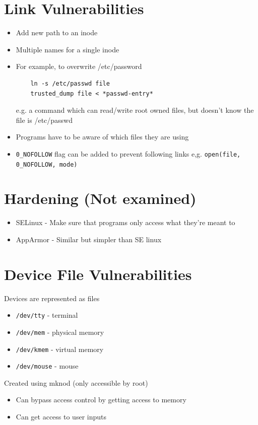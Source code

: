 \documentclass{article}[18pt]
\begin{document}
\section{Link Vulnerabilities}
\begin{itemize}
	\item Add new path to an inode
	\item Multiple names for a single inode
	\item For example, to overwrite /etc/password
	\begin{lstlisting}
	ln -s /etc/passwd file
	trusted_dump file < *passwd-entry*
	\end{lstlisting}
	e.g. a command which can read/write root owned files, but doesn't know the file is /etc/passwd
	\item Programs have to be aware of which files they are using
	\item \texttt{0\_NOFOLLOW} flag can be added to prevent following links e,g. \texttt{open(file, 0\_NOFOLLOW, mode)}
\end{itemize}
\section{Hardening (Not examined)}
\begin{itemize}
	\item SELinux - Make sure that programs only access what they're meant to
	\item AppArmor - Similar but simpler than SE linux
\end{itemize}
\section{Device File Vulnerabilities}
Devices are represented as files
\begin{itemize}
	\item \texttt{/dev/tty} - terminal
	\item \texttt{/dev/mem} - physical memory
	\item \texttt{/dev/kmem} - virtual memory
	\item \texttt{/dev/mouse} - mouse
\end{itemize}
Created using mknod (only accessible by root)
\begin{itemize}
	\item Can bypass access control by getting access to memory
	\item Can get access to user inputs
\end{itemize}
\end{document}
